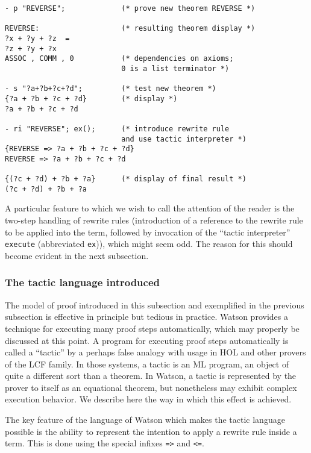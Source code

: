 \documentclass{kluwer}
\begin{document}
\begin{article}
\begin{verbatim}
- p "REVERSE";             (* prove new theorem REVERSE *)

REVERSE:                   (* resulting theorem display *)
?x + ?y + ?z  =  
?z + ?y + ?x
ASSOC , COMM , 0           (* dependencies on axioms;
                           0 is a list terminator *)

- s "?a+?b+?c+?d";         (* test new theorem *)
{?a + ?b + ?c + ?d}        (* display *)
?a + ?b + ?c + ?d

- ri "REVERSE"; ex();      (* introduce rewrite rule 
                           and use tactic interpreter *)
{REVERSE => ?a + ?b + ?c + ?d}
REVERSE => ?a + ?b + ?c + ?d

{(?c + ?d) + ?b + ?a}      (* display of final result *)
(?c + ?d) + ?b + ?a

\end{verbatim}

\normalsize

A particular feature to which we wish to call the attention of the
reader is the two-step handling of rewrite rules (introduction of a
reference to the rewrite rule to be applied into the term, followed by
invocation of the ``tactic interpreter'' {\tt execute} (abbreviated
{\tt ex})), which might seem odd.  The reason for this should become
evident in the next subsection.

\subsubsection{The tactic language introduced}

The model of proof introduced in this subsection and exemplified in
the previous subsection is effective in principle but tedious in
practice.  Watson provides a technique for executing many proof steps
automatically, which may properly be discussed at this point.  A
program for executing proof steps automatically is called a ``tactic''
by a perhaps false analogy with usage in HOL and other provers of the
LCF family.  In those systems, a tactic is an ML program, an object of
quite a different sort than a theorem.  In Watson, a tactic is
represented by the prover to itself as an equational theorem, but
nonetheless may exhibit complex execution behavior.  We describe here
the way in which this effect is achieved.

The key feature of the language of Watson which makes the tactic
language possible is the ability to represent the intention to apply a
rewrite rule inside a term.  This is done using the special infixes
{\tt =>} and {\tt <=}.


\end{article}
\end{document}
